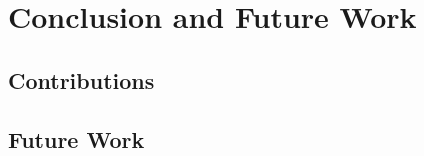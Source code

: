 \chapter{Conclusion and Future Work}
\label{cha:conclusion}

\section{Contributions}
\label{sec:contributions}

\begin{comment}
What are the main contributions made to the field?
How significant are these contributions?
Also discuss the contributions in terms of the goals and research questions formulated in the Introduction.

The contributions section will normally contain everything that you address in the abstract, but in an extended form and quite possibly additional issues that cannot be included in the abstract.
An obvious difference is that when the reader has come this far in the text, she/he should be quite familiar with the work, but while reading the abstract they will have little to no knowledge of the work.

The section ``Contributions'' in Chapter~\ref{cha:introduction} differs from this one in that the former is just a list of the main bits, while this section should explain them in more detail.
However, basically the same items should appear in both sections.
\end{comment}

\section{Future Work}
\label{sec:futureWork}

\begin{comment}
Consider where you would like to extend or improve this work, or how somebody else could continue it.
These extensions might either be continuing the ongoing direction or taking a side direction that became obvious during the work.
Further, possible solutions to limitations in the work conducted, highlighted in Section~\ref{sec:discussion} may be presented.

Note that in the Specialisation Project Report, the Future Work section will be a key part of your plan for the novel work to be carried out in the next semester,
while in the Master's Thesis, the Future Work section rather will point to issues that others might be interested in addressing.
This can include options and alternatives that you did not try out yourself, or potential improvements and extensions to your experiments or system.
\end{comment}

